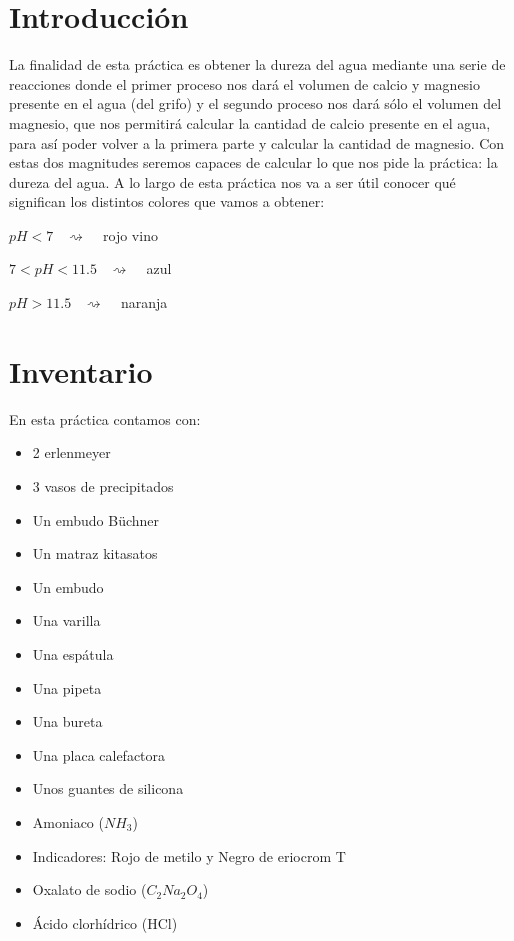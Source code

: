 \section{Introducción}   %
\noindent La finalidad de esta práctica es obtener la dureza del agua mediante una serie de reacciones donde el primer proceso nos dará el volumen de calcio y magnesio presente en el agua (del grifo) y el segundo proceso nos dará sólo el volumen del magnesio, que nos permitirá calcular la cantidad de calcio presente en el agua, para así poder volver a la primera parte y calcular la cantidad de magnesio. Con estas dos magnitudes seremos capaces de calcular lo que nos pide la práctica: la dureza del agua. A lo largo de esta práctica nos va a ser útil conocer qué significan los distintos colores que vamos a obtener:

\begin{multicols}{3}
    $pH < 7$ ~$\rightsquigarrow$ ~ rojo vino
    
    \vspace{0.1cm}
    
    $7 < pH < 11.5$ ~$\rightsquigarrow$ ~ azul
    
    \vspace{0.1cm}
    
    $pH > 11.5$ ~$\rightsquigarrow$ ~ naranja
\end{multicols}

\section{Inventario}  
\noindent En esta práctica contamos con:
\begin{multicols}{2}
    \begin{itemize}
        \item 2 erlenmeyer
        \item 3 vasos de precipitados
        \item Un embudo Büchner
        \item Un matraz kitasatos
        \item Un embudo
        \item Una varilla
        \item Una espátula
        \item Una pipeta 
        \item Una bureta
        \item Una placa calefactora
        \item Unos guantes de silicona
        \item Amoniaco ($NH_3$)
        \item Indicadores: Rojo de metilo y Negro de eriocrom T
        \item Oxalato de sodio ($C_2Na_2O_4$)
        \item Ácido clorhídrico (HCl)
    \end{itemize}
\end{multicols}

